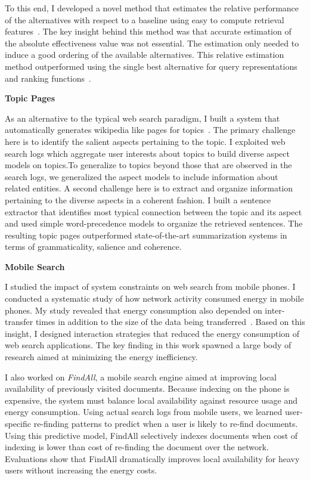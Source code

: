 \documentclass[a4paper,11pt,onecolumn]{article}
\begin{document}
To this end, I developed a novel method that estimates the relative performance of the alternatives with respect to a baseline using easy to compute retrieval features~\cite{balasubramanian-sigir10a}. The key insight behind this method was that accurate estimation of the absolute effectiveness value was not essential. The estimation only needed to induce a good ordering of the available alternatives. This relative estimation method outperformed using the single best alternative for query representations~\cite{balasubramanian-sigir10b} and ranking functions~\cite{balasubramanian-sigir10c}. 


{\bf Topic Pages}

As an alternative to the typical web search paradigm, I built a system that automatically generates wikipedia like pages for topics~\cite{balasubramanian-icsc2010}. The primary challenge here is to identify the salient aspects pertaining to the topic. I exploited web search logs which aggregate user interests about topics to build diverse aspect models on topics.To generalize to topics beyond those that are observed in the search logs, we generalized the aspect models to include information about related entities. A second challenge here is to extract and organize information pertaining to the diverse aspects in a coherent fashion. I built a sentence extractor that identifies most typical connection between the topic and its aspect and used simple word-precedence models to organize the retrieved sentences. The resulting topic pages outperformed state-of-the-art summarization systems in terms of grammaticality, salience and coherence.

{\bf Mobile Search}

I studied the impact of system constraints on web search from mobile phones. I conducted a systematic study of how network activity consumed energy in mobile phones. My study revealed that energy consumption also depended on inter-transfer times in addition to the size of the data being transferred~\cite{balasubramanian-imc09}. Based on this insight, I designed interaction strategies that reduced the energy consumption of web search applications. The key finding in this work spawned a large body of research aimed at minimizing the energy inefficiency. 

I also worked on {\em FindAll}, a mobile search engine aimed at improving local availability of previously visited documents. Because indexing on the phone is expensive, the system must balance local availability against resource usage and energy consumption. Using actual search logs from mobile users, we learned user-specific re-finding patterns to predict when a user is likely to re-find documents. Using this predictive model, FindAll selectively indexes documents when cost of indexing is lower than cost of re-finding the document over the network. Evaluations show that FindAll dramatically improves local availability for heavy users without increasing the energy costs.
\end{document}
